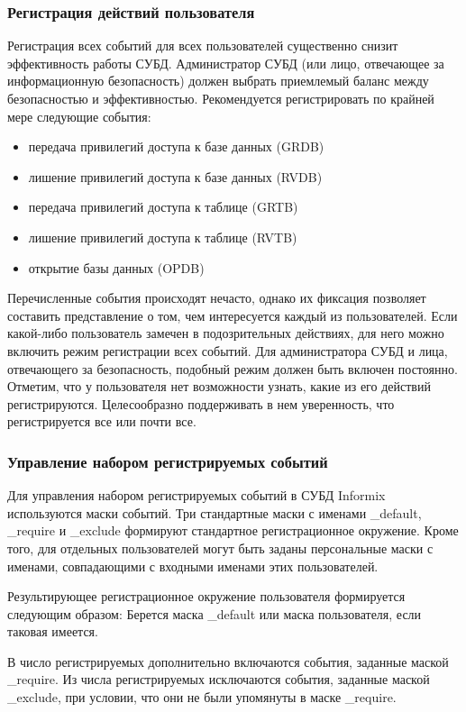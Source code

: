 \subsubsection{Регистрация действий пользователя}
Регистрация всех событий для всех пользователей существенно снизит эффективность работы СУБД.
Администратор СУБД (или лицо, отвечающее за информационную безопасность) должен выбрать приемлемый
баланс между безопасностью и эффективностью.
Рекомендуется регистрировать по крайней мере следующие события:
\begin{itemize}
    \item передача привилегий доступа к базе данных (GRDB)
    \item лишение привилегий доступа к базе данных (RVDB)
    \item передача привилегий доступа к таблице (GRTB)
    \item лишение привилегий доступа к таблице (RVTB)
    \item открытие базы данных (OPDB)
\end{itemize}

Перечисленные события происходят нечасто, однако их фиксация позволяет составить представление о
том, чем интересуется каждый из пользователей. Если какой-либо пользователь замечен в
подозрительных действиях, для него можно включить режим регистрации всех событий. Для
администратора СУБД и лица, отвечающего за безопасность, подобный режим должен быть включен
постоянно.
Отметим, что у пользователя нет возможности узнать, какие из его действий регистрируются.
Целесообразно поддерживать в нем уверенность, что регистрируется все или почти все.


\subsubsection{Управление набором регистрируемых событий}
Для управления набором регистрируемых событий в СУБД Informix используются маски событий.
Три стандартные маски с именами \_default, \_require и \_exclude формируют стандартное
регистрационное окружение. Кроме того, для отдельных пользователей могут быть заданы персональные
маски с именами, совпадающими с входными именами этих пользователей.

Результирующее регистрационное окружение пользователя формируется следующим образом:
Берется маска \_default или маска пользователя, если таковая имеется.

В число регистрируемых дополнительно включаются события, заданные маской \_require.
Из числа регистрируемых исключаются события, заданные маской \_exclude, при условии, что они не
были упомянуты в маске \_require.

